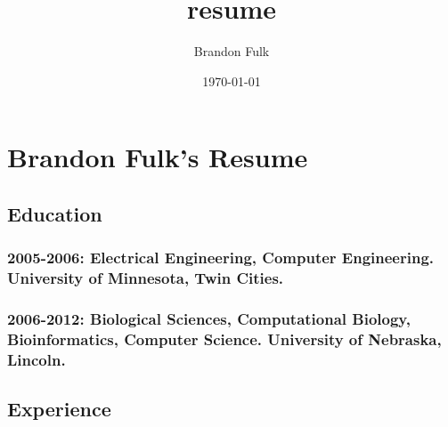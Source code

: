\documentclass[11pt]{article}
\author{Brandon Fulk}
\date{\today}
\title{resume}
\begin{document}
\maketitle
\tableofcontents

\section{Brandon Fulk's Resume}
\label{sec-1}
\subsection{Education}
\label{sec-1-1}
\subsubsection{2005-2006: Electrical Engineering, Computer Engineering.  University of Minnesota, Twin Cities.}
\label{sec-1-1-1}
\subsubsection{2006-2012: Biological Sciences, Computational Biology, Bioinformatics, Computer Science.  University of Nebraska, Lincoln.}
\label{sec-1-1-2}

\subsection{Experience}
\label{sec-1-2}
\end{document}
